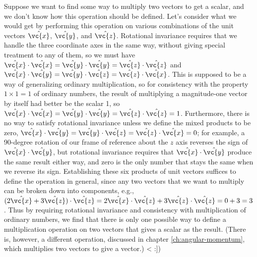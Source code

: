         Suppose we want to find some way to multiply two vectors to get a scalar, and we don't know
        how this operation should be defined. Let's consider what we would get
        by performing this operation on various combinations of the unit vectors
        $\hat{\vc{x}}$, $\hat{\vc{y}}$, and $\hat{\vc{z}}$.
        Rotational invariance requires that we handle the three coordinate axes
        in the same way, without giving special treatment to any of them, so we must
        have $\hat{\vc{x}}\cdot\hat{\vc{x}}=\hat{\vc{y}}\cdot\hat{\vc{y}}=\hat{\vc{z}}\cdot\hat{\vc{z}}$
        and $\hat{\vc{x}}\cdot\hat{\vc{y}}=\hat{\vc{y}}\cdot\hat{\vc{z}}=\hat{\vc{z}}\cdot\hat{\vc{x}}$.
        This is supposed to be a way of generalizing ordinary multiplication, so for consistency
        with the property $1\times1=1$ of ordinary numbers, the result
        of multiplying a magnitude-one vector by itself had better be the scalar 1, so
        $\hat{\vc{x}}\cdot\hat{\vc{x}}=\hat{\vc{y}}\cdot\hat{\vc{y}}=\hat{\vc{z}}\cdot\hat{\vc{z}}=1$.
        Furthermore, there is no way to satisfy rotational invariance unless we define the mixed
        products to be zero,
        $\hat{\vc{x}}\cdot\hat{\vc{y}}=\hat{\vc{y}}\cdot\hat{\vc{z}}=\hat{\vc{z}}\cdot\hat{\vc{x}}=0$;
        for example, a 90-degree rotation of our frame of reference about the $z$ axis
        reverses the sign of $\hat{\vc{x}}\cdot\hat{\vc{y}}$, but rotational invariance requires
        that $\hat{\vc{x}}\cdot\hat{\vc{y}}$ produce the same result either way, and zero is the
        only number that stays the same when we reverse its sign. Establishing these six
        products of unit vectors suffices to define the operation in general, since any
        two vectors that we want to multiply can be broken down into components, e.g.,
        $(2\hat{\vc{x}}+3\hat{\vc{z}})\cdot\hat{\vc{z}}
        =2\hat{\vc{x}}\cdot\hat{\vc{z}}+3\hat{\vc{z}}\cdot\hat{\vc{z}}=0+3=3$. Thus by
        requiring rotational invariance and consistency with multiplication of ordinary
        numbers, we find that there is only one possible way to define a multiplication
        operation on two vectors that gives a scalar as the result. (There is, however,
        a different operation, discussed in chapter \ref{ch:angular-momentum}, which multiplies two vectors
        to give a vector.)
<%
:])

